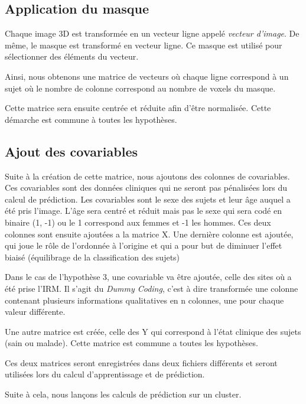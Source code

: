 \subsection{Application du masque}

Chaque image 3D est transformée en un vecteur ligne appelé \textit{vecteur d'image}.
De même, le masque est transformé en vecteur ligne.
Ce masque est utilisé pour sélectionner des éléments du vecteur.

Ainsi, nous obtenons une matrice de vecteurs où chaque ligne correspond à un sujet où le nombre de colonne correspond au nombre de voxels du masque.

Cette matrice sera ensuite centrée et réduite afin d'être normalisée. 
Cette démarche est commune à toutes les hypothèses. 

\subsection{Ajout des covariables}

Suite à la création de cette matrice, nous ajoutons des colonnes de covariables. Ces covariables sont des données cliniques qui ne seront pas pénalisées lors du calcul de prédiction. Les covariables sont le sexe des sujets et leur âge auquel a été pris l'image. 
L'âge sera centré et réduit mais pas le sexe qui sera codé en binaire (1, -1) ou le 1 correspond aux femmes et -1 les hommes. 
Ces deux colonnes sont ensuite ajoutées a la matrice X. 
Une dernière colonne est ajoutée, qui joue le rôle de l'ordonnée à l'origine et qui a pour but de diminuer l'effet biaisé (équilibrage de la classification des sujets)

Dans le cas de l'hypothèse 3, une covariable va être ajoutée, celle des sites où a été prise l'IRM. Il s'agit du \textit{Dummy Coding}, c'est à dire transformée une colonne contenant plusieurs informations qualitatives en n colonnes, une pour chaque valeur différente. 

Une autre matrice est créée, celle des Y qui correspond à l'état clinique des sujets (sain ou malade). Cette matrice est commune a toutes les hypothèses. 

Ces deux matrices seront enregistrées dans deux fichiers différents et seront utilisées lors du calcul d'apprentissage et de prédiction.


Suite à cela, nous lançons les calculs de prédiction sur un cluster. 


